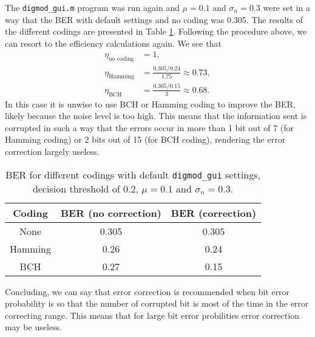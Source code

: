 \documentclass[11pt,titlepage]{report}
\begin{document}
The \texttt{digmod\_gui.m} program was run again and $\mu=0.1$ and $\sigma_n=0.3$ were set in a way that the BER with default settings and no coding was \num{0.305}. The results of the different codings are presented in Table \ref{tab:task4-diff-coding-mu-sigma}. Following the procedure above, we can resort to the efficiency calculations again. We see that
\begin{align*}
\eta_{\text{no coding}}&=1,\\
\eta_{\text{Hamming}}&=\frac{0.305/0.24}{1.75}\approx0.73,\\
\eta_{\text{BCH}}&=\frac{0.305/0.15}{3}\approx0.68.
\end{align*}
In this case it is unwise to use BCH or Hamming coding to improve the BER, likely because the noise level is too high. This means that the information sent is corrupted in such a way that the errors occur in more than \num{1} bit out of \num{7} (for Hamming coding) or \num{2} bits out of \num{15} (for BCH coding), rendering the error correction largely useless.
\begin{table}[H]
	\centering
	\caption{BER for different codings with default \texttt{digmod\_gui} settings, decision threshold of 0.2, $\mu=0.1$ and $\sigma_n=0.3$.}
	\label{tab:task4-diff-coding-mu-sigma}
	\begin{tabular}{c c c}
		\hline\hline
		Coding & BER (no correction) & BER (correction)\\
		\hline
		None & 0.305 & 0.305\\
		Hamming & 0.26 & 0.24 \\
		BCH & 0.27 & 0.15\\
		\hline
	\end{tabular}
\end{table}

Concluding, we can say that error correction is recommended when bit error probability is so that the number of corrupted bit is most of the time in the error correcting range. This means that for large bit error probilities error correction may be useless.
\end{document}
